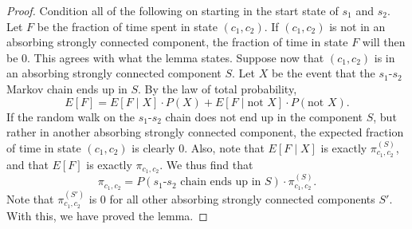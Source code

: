 \documentclass[12pt]{article}
\theoremstyle{definition}
\newtheorem{lemma}[theorem]{Lemma}
\theoremstyle{remark}
\begin{document}
\begin{proof}
  Condition all of the following on starting in the start state of $s_1$ and $s_2$. Let $F$ be the fraction of time spent in state $(c_1,c_2)$. If $(c_1,c_2)$ is not in an absorbing strongly connected component, the fraction of time in state $F$ will then be 0. This agrees with what the lemma states. Suppose now that $(c_1,c_2)$ is in an absorbing strongly connected component $S$.
  Let $X$ be the event that the $s_1$-$s_2$ Markov chain ends up in $S$. By the law of total probability, \begin{equation*}
    E[F] = E[F \mid X] \cdot P(X) + E[F \mid \text{not } X] \cdot P(\text{not } X).
  \end{equation*}
   If the random walk on the $s_1$-$s_2$ chain does not end up in the component $S$, but rather in another absorbing strongly connected component, the expected fraction of time in state $(c_1,c_2)$ is clearly 0. Also, note that $E[F \mid X]$ is exactly $\pi^{(S)}_{c_1,c_2}$, and that $E[F]$ is exactly $\pi_{c_1,c_2}$. We thus find that \begin{equation*}
     \pi_{c_1,c_2} = P(\text{$s_1$-$s_2$ chain ends up in $S$}) \cdot \pi^{(S)}_{c_1,c_2}.
   \end{equation*}
   Note that $\pi^{(S')}_{c_1,c_2}$ is 0 for all other absorbing strongly connected components $S'$. With this, we have proved the lemma.
\end{proof}



\end{document}
